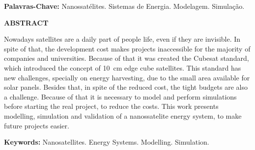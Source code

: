 \documentclass[a5paper, oldfontcommands, hidelinks]{ufsc-thesis}  %
\begin{document}
\noindent\textbf{Palavras-Chave:} Nanossatélites. Sistemas de Energia. Modelagem. Simulação.

\clearpage
\begin{center}
\large\textbf{ABSTRACT}
\end{center}
Nowadays satellites are a daily part of people life, even if they are invisible. In spite of that, the development cost makes projects inaccessible for the majority of companies and universities. Because of that it was created the Cubesat standard, which introduced the concept of \SI{10}{\centi\metre} edge cube satellites. This standard has new challenges, specially on energy harvesting, due to the small area available for solar panels. Besides that, in spite of the reduced cost, the tight budgets are also a challenge.  Because of that it is necessary to model and perform simulations before starting the real project, to reduce the costs. This work  presents modelling, simulation and validation of a nanossatelite energy system, to make future projects easier.

\noindent\textbf{Keywords:} Nanosatellites. Energy Systems. Modelling. Simulation.

\clearpage
\listoffigures
\clearpage
\listoftables
\glsaddall 
\printglossary[type=\acronymtype, title = Lista de Abreviaturas e Siglas]
\clearpage
\printnoidxglossary[type=symbols, sort=standard, title = Lista de Símbolos]
\clearpage
\setcounter{tocdepth}{3} %
\tableofcontents















\printbibliography
\end{document}
